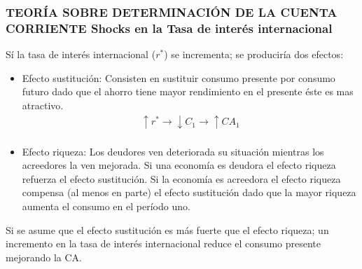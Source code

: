 \documentclass[10pt, xcolor=table, x11names]{beamer}
\begin{document}
\begin{frame}[label=14]
	\frametitle{{\normalsize TEORÍA SOBRE DETERMINACIÓN DE LA CUENTA CORRIENTE} {Shocks en la Tasa de interés internacional}}
	Sí la tasa de interés internacional ($ r^{*}$) se incrementa; se produciría dos efectos:
	\begin{itemize}
		\item Efecto sustitución: Consisten en sustituir consumo presente por consumo futuro dado que el ahorro tiene mayor rendimiento en el presente éste es mas atractivo.\\
		\begin{align}
	\uparrow r^{*}\rightarrow \downarrow C_{1}\rightarrow\uparrow CA_{1}\nonumber \\
		\end{align}
		\item Efecto riqueza: Los deudores ven deteriorada su situación mientras los acreedores la ven mejorada. Si una economía es deudora el efecto riqueza refuerza el efecto sustitución. Si la economía es acreedora el efecto riqueza compensa (al menos en parte) el efecto sustitución dado que la mayor riqueza aumenta el consumo en el período uno.
	\end{itemize}
	Si se asume que el efecto sustitución es más fuerte que el efecto riqueza; un incremento en la tasa de interés internacional reduce el consumo presente mejorando la CA.	
\end{frame}
\end{document}
